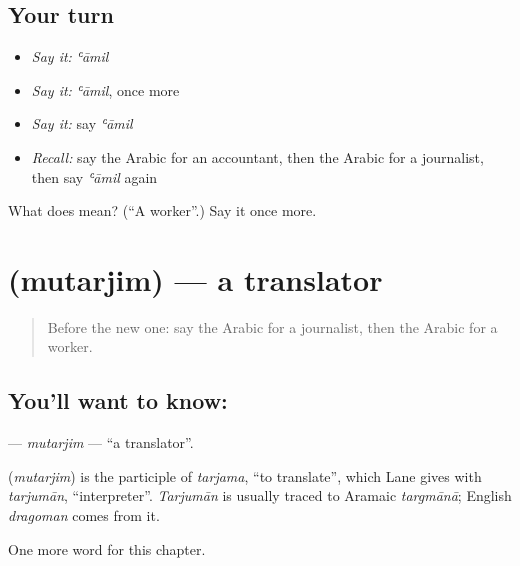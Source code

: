 \subsection*{Your turn}
\begin{itemize}
\raggedright
  \item \emph{Say it:} \emph{ʿāmil}
  \item \emph{Say it:} \emph{ʿāmil}, once more
  \item \emph{Say it:} say \emph{ʿāmil}
  \item \emph{Recall:} say the Arabic for an accountant, then the Arabic for a journalist, then say \emph{ʿāmil} again
\end{itemize}

\begin{tcolorbox}[breakable,colback=teal!4,colframe=teal!35!black,title={Before you move on}]
What does  mean? (\textquotedblleft{}A worker\textquotedblright{}.) Say it once more.
\end{tcolorbox}
\section[\texorpdfstring{\ar{مترجم} (mutarjim)}{مترجم (mutarjim)}]{ (mutarjim) — a translator}

\label{lesson:AR-C189-mutarjim}



\begin{quote}
Before the new one: say the Arabic for a journalist, then the Arabic for a worker.
\end{quote}

\subsection*{You'll want to know: }
\textbf{} — \emph{mutarjim} — \textquotedblleft{}a translator\textquotedblright{}.

\begin{cousinweb}
\textbf{} (\emph{mutarjim}) is the participle of \emph{tarjama}, \textquotedblleft{}to translate\textquotedblright{}, which Lane gives with \emph{tarjumān}, \textquotedblleft{}interpreter\textquotedblright{}. \emph{Tarjumān} is usually traced to Aramaic \emph{targmānā}; English \emph{dragoman} comes from it.
\end{cousinweb}

\begin{grammarlens}[title={What you've built}]
One more word for this chapter.
\end{grammarlens}

